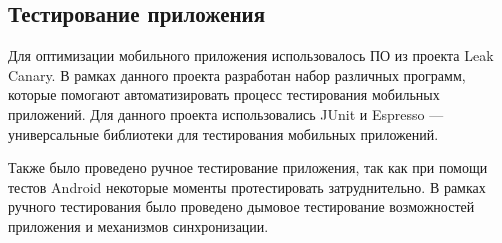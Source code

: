 \subsection{Тестирование приложения}
Для оптимизации мобильного приложения использовалось ПО из проекта Leak Canary. В рамках данного проекта разработан набор различных программ, которые помогают автоматизировать процесс тестирования мобильных приложений. Для данного проекта использовались JUnit и Espresso — универсальные библиотеки для тестирования мобильных приложений.
 
Также было проведено ручное тестирование приложения, так как при помощи тестов Android некоторые моменты протестировать затруднительно. В рамках ручного тестирования было проведено дымовое тестирование возможностей приложения и механизмов синхронизации.



